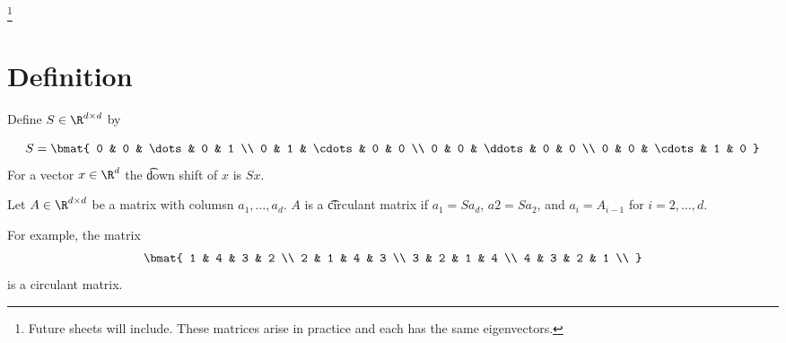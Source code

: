 
\footnote{Future sheets will include. These matrices arise in practice and each has the same eigenvectors.}

\section{Definition}

Define $S \in \R^{d \times d}$ by

\[
  S = \bmat{
    0 & 0 & \dots & 0 & 1 \\
    0 & 1 & \cdots & 0 & 0 \\
    0 & 0 & \ddots & 0 & 0 \\
    0 & 0 & \cdots & 1 & 0
  }
\]
For a vector $x \in \R^d$ the \t{down shift} of $x$ is $Sx$.

Let $A \in \R^{d \times d}$ be a matrix with columsn $a_1, \dots, a_d$.
$A$ is a \t{circulant matrix} if $a_1 = Sa_d$, $a2 = Sa_2$, and $a_i = A_{i -1}$ for $i = 2, \dots, d$.


For example, the matrix
\[
  \bmat{
    1 & 4 & 3 & 2 \\
    2 & 1 & 4 & 3 \\
    3 & 2 & 1 & 4 \\
    4 & 3 & 2 & 1 \\
  }
\]
is a circulant matrix.

\blankpage
